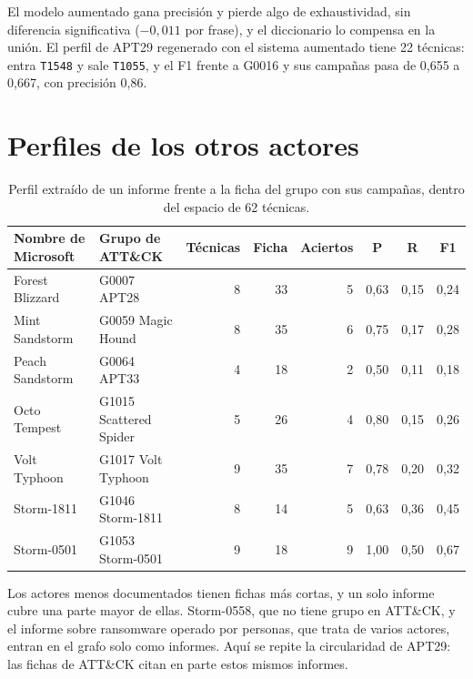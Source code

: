 El modelo aumentado gana precisión y pierde algo de exhaustividad, sin diferencia significativa
($-0{,}011$ por frase), y el diccionario lo compensa en la unión. El perfil de APT29 regenerado con el
sistema aumentado tiene 22 técnicas: entra \texttt{T1548} y sale \texttt{T1055}, y el F1 frente a
G0016 y sus campañas pasa de 0,655 a 0,667, con precisión 0,86.

\section{Perfiles de los otros actores}

\begin{table}[H]
\centering
\small
\begin{tabular}{|l|l|r|r|r|c|c|c|}
\hline
\textbf{Nombre de Microsoft} & \textbf{Grupo de ATT\&CK} & \textbf{Técnicas} & \textbf{Ficha} & \textbf{Aciertos} & \textbf{P} & \textbf{R} & \textbf{F1} \\
\hline
Forest Blizzard & G0007 APT28 & 8 & 33 & 5 & 0,63 & 0,15 & 0,24 \\
Mint Sandstorm & G0059 Magic Hound & 8 & 35 & 6 & 0,75 & 0,17 & 0,28 \\
Peach Sandstorm & G0064 APT33 & 4 & 18 & 2 & 0,50 & 0,11 & 0,18 \\
Octo Tempest & G1015 Scattered Spider & 5 & 26 & 4 & 0,80 & 0,15 & 0,26 \\
Volt Typhoon & G1017 Volt Typhoon & 9 & 35 & 7 & 0,78 & 0,20 & 0,32 \\
Storm-1811 & G1046 Storm-1811 & 8 & 14 & 5 & 0,63 & 0,36 & 0,45 \\
Storm-0501 & G1053 Storm-0501 & 9 & 18 & 9 & 1,00 & 0,50 & 0,67 \\
\hline
\end{tabular}
\caption{Perfil extraído de un informe frente a la ficha del grupo con sus campañas, dentro del
espacio de 62 técnicas.}
\end{table}

Los actores menos documentados tienen fichas más cortas, y un solo informe cubre una parte mayor
de ellas. Storm-0558, que no tiene grupo en ATT\&CK, y el informe sobre ransomware operado por
personas, que trata de varios actores, entran en el grafo solo como informes. Aquí se repite la
circularidad de APT29: las fichas de ATT\&CK citan en parte estos mismos informes.

